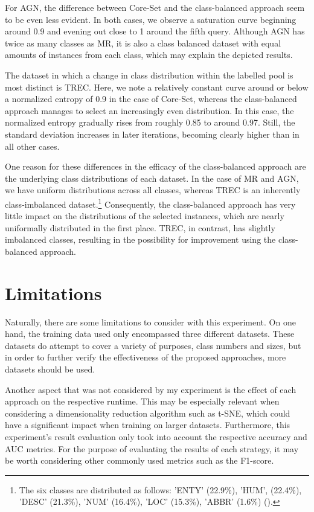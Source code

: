 \documentclass[english,bachelor,ul]{webisthesis} %
\begin{document}
For AGN, the difference between Core-Set and the class-balanced approach seem to be even less evident. In both cases, we observe a saturation curve beginning around 0.9 and evening out close to 1 around the fifth query. Although AGN has twice as many classes as MR, it is also a class balanced dataset with equal amounts of instances from each class, which may explain the depicted results.

The dataset in which a change in class distribution within the labelled pool is most distinct is TREC. Here, we note a relatively constant curve around or below a normalized entropy of 0.9 in the case of Core-Set, whereas the class-balanced approach manages to select an increasingly even distribution. In this case, the normalized entropy gradually rises from roughly 0.85 to around 0.97. Still, the standard deviation increases in later iterations, becoming clearly higher than in all other cases. 

One reason for these differences in the efficacy of the class-balanced approach are the underlying class distributions of each dataset. In the case of MR and AGN, we have uniform distributions across all classes, whereas TREC is an inherently class-imbalanced dataset.\footnote{The six classes are distributed as follows: 'ENTY' (22.9\%), 'HUM', (22.4\%), 'DESC' (21.3\%), 'NUM' (16.4\%), 'LOC' (15.3\%), 'ABBR' (1.6\%) (\cite{DBLP:journals/nle/LiR06}).} Consequently, the class-balanced approach has very little impact on the distributions of the selected instances, which are nearly uniformally distributed in the first place. TREC, in contrast, has slightly imbalanced classes, resulting in the possibility for improvement using the class-balanced approach.

\section{Limitations}

Naturally, there are some limitations to consider with this experiment. On one hand, the training data used only encompassed three different datasets. These datasets do attempt to cover a variety of purposes, class numbers and sizes, but in order to further verify the effectiveness of the proposed approaches, more datasets should be used. 

Another aspect that was not considered by my experiment is the effect of each approach on the respective runtime. This may be especially relevant when considering a dimensionality reduction algorithm such as t-SNE, which could have a significant impact when training on larger datasets. Furthermore, this experiment's result evaluation only took into account the respective accuracy and AUC metrics. For the purpose of evaluating the results of each strategy, it may be worth considering other commonly used metrics such as the F1-score.
\end{document}

